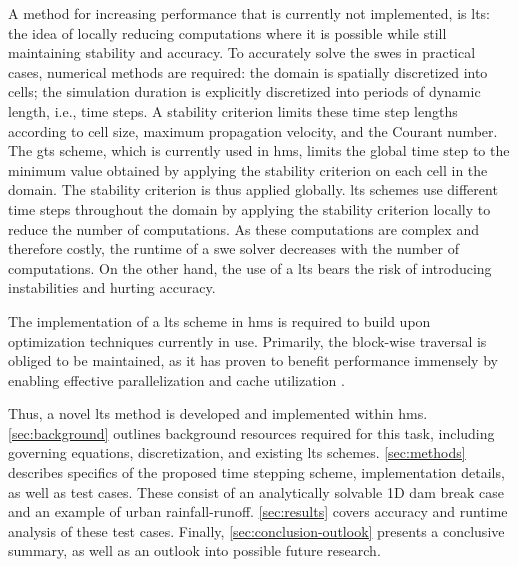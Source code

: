 A method for increasing performance that is currently not implemented, is \acrlong*{lts}: the idea of locally reducing computations where it is possible while still maintaining stability and accuracy. 
To accurately solve the \glspl{swe} in practical cases, numerical methods are required:
the domain is spatially discretized into cells; the simulation duration is explicitly discretized into periods of dynamic length, i.e., time steps.
A stability criterion limits these time step lengths according to cell size, maximum propagation velocity, and the Courant number.
The \acrlong*{gts} scheme, which is currently used in \gls{hms}, limits the global time step to the minimum value obtained by applying the stability criterion on each cell in the domain. The stability criterion is thus applied globally.
\Acrlong*{lts} schemes use different time steps throughout the domain by applying the stability criterion locally to reduce the number of computations.
As these computations are complex and therefore costly, the runtime of a \gls{swe} solver decreases with the number of computations.
On the other hand, the use of a \acrlong*{lts} bears the risk of introducing instabilities and hurting accuracy.

The implementation of a \acrlong*{lts} scheme in \gls{hms} is required to build upon optimization techniques currently in use.
Primarily, the block-wise traversal is obliged to be maintained, as it has proven to benefit performance immensely by enabling effective parallelization and cache utilization \autocite{lennart-conf}.

Thus, a novel \acrlong*{lts} method is developed and implemented within \gls{hms}.
\autoref{sec:background} outlines background resources required for this task, including governing equations, discretization, and existing \acrlong*{lts} schemes.
\autoref{sec:methods} describes specifics of the proposed time stepping scheme, implementation details, as well as test cases. 
These consist of an analytically solvable \acrlong{1D} dam break case and an example of urban rainfall-runoff.
\autoref{sec:results} covers accuracy and runtime analysis of these test cases.
Finally, \autoref{sec:conclusion-outlook} presents a conclusive summary, as well as an outlook into possible future research. 
